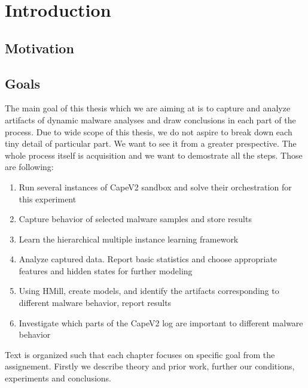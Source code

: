 \chapter{Introduction}
\section{Motivation}
\section{Goals}
The main goal of this thesis which we are aiming at is to capture and analyze artifacts of dynamic malware analyses and draw conclusions in each part of the process. Due to wide scope of this thesis, we do not aspire to break down each tiny detail of particular part. We want to see it from a greater prespective. The whole process itself is acquisition and we want to demostrate all the steps. Those are following:

\begin{enumerate}
    \item Run several instances of CapeV2 \cite{Cape} sandbox and solve their orchestration for this experiment
    \item Capture behavior of selected malware samples and store results
    \item Learn the hierarchical multiple instance learning framework
    \item Analyze captured data. Report basic statistics and choose appropriate features and hidden states for further modeling
    \item Using HMill, create models, and identify the artifacts corresponding to different malware behavior, report results
    \item Investigate which parts of the CapeV2 log are important to different malware behavior
\end{enumerate}

Text is organized such that each chapter focuses on specific goal from the assignement. Firstly we describe theory and prior work, further our conditions, experiments and conclusions.
